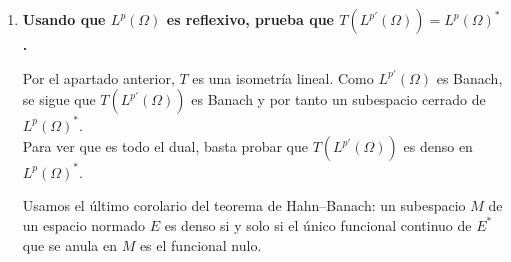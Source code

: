 \documentclass[12pt]{article}
\begin{document}
\begin{ejercicio}[4 puntos]
\begin{enumerate}[label=\alph*)]
        Ahora evaluamos el funcional en $f_0$:
        \begin{equation*}
        \int_\Omega u f_0=\int_\Omega u\,u\,|u|^{p'-2}=\int_\Omega |u|^{p'}
        =\|u\|_{L^{p'}(\Omega)}^{p'}.
        \end{equation*}
        Consideramos entonces $\displaystyle f:=\frac{f_0}{\|f_0\|_{L^p(\Omega)}}$, que satisface $\|f\|_{L^p(\Omega)}=1$. Se tiene:
        \begin{multline*}
        \|Tu\|_{(L^p(\Omega))^\ast}
        =
        \sup_{\|g\|_{L^p(\Omega)}\le 1}
        \left|\langle Tu,g\rangle\right|
        =
        \sup_{\|g\|_{L^p(\Omega)}\le 1}
        \left|\int_\Omega u g\right| \\
        \ge
        \left|\int_\Omega u\, f\right|
        =
        \frac{\int_\Omega |u|^{p'}}{\|f_0\|_{L^p(\Omega)}}
        =
        \frac{\|u\|_{L^{p'}(\Omega)}^{p'}}{\|u\|_{L^{p'}(\Omega)}^{p'-1}}
        =
        \|u\|_{L^{p'}(\Omega)}.
        \end{multline*}
        
        Junto con la desigualdad anterior concluimos
        \begin{equation*}
        \|Tu\|_{(L^p(\Omega))^\ast}=\|u\|_{L^{p'}(\Omega)}.
        \end{equation*}
        
        Finalmente, $T$ es una isometría lineal, y sabemos que toda isometría lineal es inyectiva: si $Tu=0$ porque
        \begin{equation*}
        0=\|Tu\|_{(L^p(\Omega))^\ast}=\|u\|_{L^{p'}(\Omega)}
        \quad\Longrightarrow\quad
        u=0 \ \text{a.e.}
        \end{equation*}
        \item \textbf{Usando que $L^p(\Omega)$ es reflexivo, prueba que $T(L^{p'}(\Omega))=L^p(\Omega)^\ast$.}
        
        Por el apartado anterior, $T$ es una isometría lineal. Como $L^{p'}(\Omega)$ es Banach,
        se sigue que $T(L^{p'}(\Omega))$ es Banach y por tanto un subespacio cerrado de $L^p(\Omega)^\ast$.\\
        Para ver que es todo el dual, basta probar que $T(L^{p'}(\Omega))$ es denso en $L^p(\Omega)^\ast$.
        
        Usamos el último corolario del teorema de Hahn--Banach: un subespacio $M$ de un espacio normado $E$ es denso si y solo si el único funcional continuo de $E^\ast$ que se anula en $M$ es el funcional nulo.



\end{enumerate}
\end{ejercicio}
\end{document}
